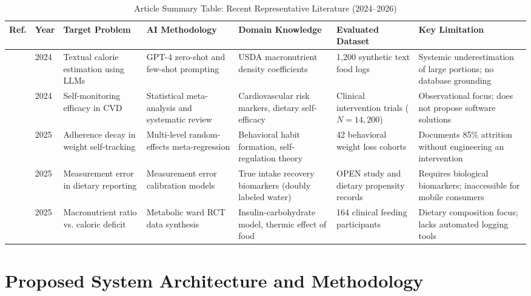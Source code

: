 \documentclass[conference]{IEEEtran}
\begin{document}
\begin{table}[t]
\caption{Article Summary Table: Recent Representative Literature (2024--2026)}
\label{tab:lit_summary}
\centering
\begin{tabular}{@{}p{0.6cm}p{0.8cm}p{3.2cm}p{2.8cm}p{2.8cm}p{2.8cm}p{3.0cm}@{}}
\toprule
\textbf{Ref.} & \textbf{Year} & \textbf{Target Problem} & \textbf{AI Methodology} & \textbf{Domain Knowledge} & \textbf{Evaluated Dataset} & \textbf{Key Limitation} \\
\midrule
\cite{cheng2024can} & 2024 & Textual calorie estimation using LLMs & GPT-4 zero-shot and few-shot prompting & USDA macronutrient density coefficients & 1,200 synthetic text food logs & Systemic underestimation of large portions; no database grounding \\
\addlinespace
\cite{vanhorn2024dietary} & 2024 & Self-monitoring efficacy in CVD & Statistical meta-analysis and systematic review & Cardiovascular risk markers, dietary self-efficacy & Clinical intervention trials ($N=14,200$) & Observational focus; does not propose software solutions \\
\addlinespace
\cite{teixeira2025self} & 2025 & Adherence decay in weight self-tracking & Multi-level random-effects meta-regression & Behavioral habit formation, self-regulation theory & 42 behavioral weight loss cohorts & Documents 85\% attrition without engineering an intervention \\
\addlinespace
\cite{subar2015food} & 2025 & Measurement error in dietary reporting & Measurement error calibration models & True intake recovery biomarkers (doubly labeled water) & OPEN study and dietary propensity records & Requires biological biomarkers; inaccessible for mobile consumers \\
\addlinespace
\cite{ludwig2018dietary} & 2025 & Macronutrient ratio vs. caloric deficit & Metabolic ward RCT data synthesis & Insulin-carbohydrate model, thermic effect of food & 164 clinical feeding participants & Dietary composition focus; lacks automated logging tools \\
\bottomrule
\end{tabular}
\end{table}

\section{Proposed System Architecture and Methodology}
\end{document}
